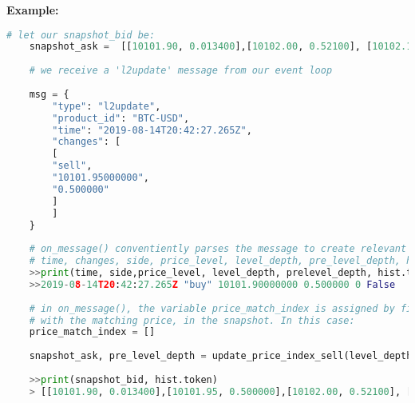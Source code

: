 \textbf{Example:}
\begin{lstlisting}[language=Python]
	# let our snapshot_bid be:
	snapshot_ask =  [[10101.90, 0.013400],[10102.00, 0.52100], [10102.11, 0.89041]]
	
	# we receive a 'l2update' message from our event loop
	
	msg = {
		"type": "l2update",
		"product_id": "BTC-USD",
		"time": "2019-08-14T20:42:27.265Z",
		"changes": [
		[
		"sell",
		"10101.95000000",
		"0.500000"
		]
		]
	}
	
	# on_message() conventiently parses the message to create relevant local variables
	# time, changes, side, price_level, level_depth, pre_level_depth, hist.token
	>>print(time, side,price_level, level_depth, prelevel_depth, hist.token)
	>>2019-08-14T20:42:27.265Z "buy" 10101.90000000 0.500000 0 False
	
	# in on_message(), the variable price_match_index is assigned by finding the index
	# with the matching price, in the snapshot. In this case:
	price_match_index = [] 
	
	snapshot_ask, pre_level_depth = update_price_index_sell(level_depth, price_level, pre_level_depth)
	
	>>print(snapshot_bid, hist.token)
	> [[10101.90, 0.013400],[10101.95, 0.500000],[10102.00, 0.52100], [10102.11, 0.89041]] True
\end{lstlisting}